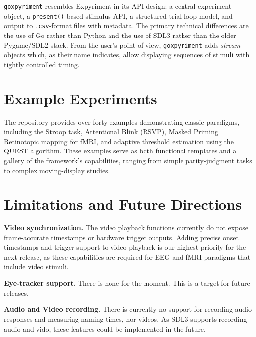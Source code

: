 \documentclass[jou,a4paper]{apa7}
\begin{document}
\texttt{goxpyriment} resembles Expyriment in its API design: a central
experiment object, a \texttt{present()}-based stimulus API, a structured
trial-loop model, and output to \texttt{.csv}-format files with metadata. The
primary technical differences are the use of Go rather than Python and the use
of SDL3 rather than the older Pygame/SDL2 stack. From the user's point of view,
\texttt{goxpyriment} adds \emph{stream} objects which, as their name indicates,
allow displaying sequences of stimuli with tightly controlled timing.

\section{Example Experiments}\label{example-experiments}

The repository provides over forty examples demonstrating classic paradigms,
including the Stroop task, Attentional Blink (RSVP), Masked Priming,
Retinotopic mapping for fMRI, and adaptive threshold estimation using the QUEST
algorithm. These examples serve as both functional templates and a gallery of
the framework's capabilities, ranging from simple parity-judgment tasks to
complex moving-display studies.



%


\section{Limitations and Future Directions}\label{limitations-and-future-directions}


\textbf{Video synchronization.} The video playback functions currently
do not expose frame-accurate timestamps or hardware trigger
outputs. Adding precise onset timestamps and trigger support to video
playback is our highest priority for the next release, as these
capabilities are required for EEG and fMRI paradigms that include
video stimuli.

\textbf{Eye-tracker support.} There is none for the moment. This is
a target for future releases.

\textbf{Audio and Video recording}. There is currently no support for recording
audio responses and measuring naming times, nor videos. As SDL3 supports recording
audio and vido, these features could be implemented in the future.
\end{document}
